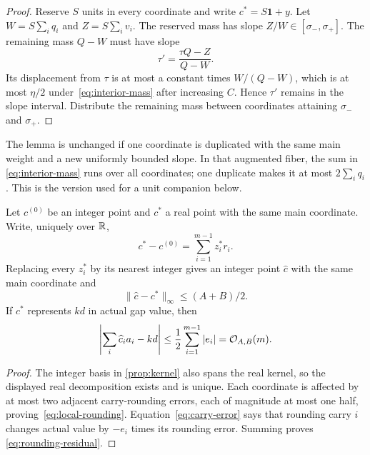 \begin{proof}
  Reserve $S$ units in every coordinate and write $c^*=S\mathbf1+y$.  Let
  $W=S\sum_iq_i$ and $Z=S\sum_iv_i$.  The reserved mass has slope
  $Z/W\in[\sigma_-,\sigma_+]$.  The remaining mass $Q-W$ must have slope
  \[
    \tau'=\frac{\tau Q-Z}{Q-W}.
  \]
  Its displacement from $\tau$ is at most a constant times $W/(Q-W)$, which
  is at most $\eta/2$ under~\eqref{eq:interior-mass} after increasing $C$.
  Hence $\tau'$ remains in the slope interval.  Distribute the remaining mass
  between coordinates attaining $\sigma_-$ and $\sigma_+$.
\end{proof}

The lemma is unchanged if one coordinate is duplicated with the same main
weight and a new uniformly bounded slope.  In that augmented fiber, the sum in
\eqref{eq:interior-mass} runs over all coordinates; one duplicate makes it at
most $2\sum_iq_i$.  This is the version used for a unit companion below.

\begin{lemma}
  \label{lem:rounding}
  Let $c^{(0)}$ be an integer point and $c^*$ a real point with the same main
  coordinate.  Write, uniquely over $\mathbb{R}$,
  \[
    c^*-c^{(0)}=\sum_{i=1}^{m-1}z_i^*r_i.
  \]
  Replacing every $z_i^*$ by its nearest integer gives an integer point
  $\widehat c$ with the same main coordinate and
  \begin{equation}
    \|\widehat c-c^*\|_\infty\le(A+B)/2.
    \label{eq:local-rounding}
  \end{equation}
  If $c^*$ represents $kd$ in actual gap value, then
  \begin{equation}
    \left|\sum_i\widehat c_i a_i-kd\right|
    \le\frac12\sum_{i=1}^{m-1}|e_i|
    =\mathcal{O}_{A,B}(m).
    \label{eq:rounding-residual}
  \end{equation}
\end{lemma}

\begin{proof}
  The integer basis in \cref{prop:kernel} also spans the real kernel, so the
  displayed real decomposition exists and is unique.
  Each coordinate is affected by at most two adjacent carry-rounding errors,
  each of magnitude at most one half, proving~\eqref{eq:local-rounding}.
  Equation~\eqref{eq:carry-error} says that rounding carry $i$ changes actual
  value by $-e_i$ times its rounding error.  Summing proves
  \eqref{eq:rounding-residual}.
\end{proof}

